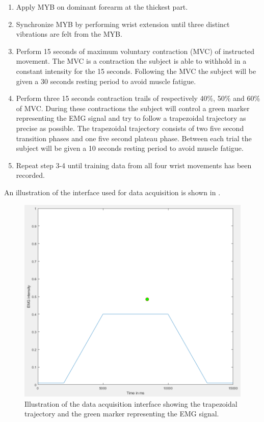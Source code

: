\begin{enumerate}
	\item Apply MYB on dominant forearm at the thickest part.
	\item Synchronize MYB by performing wrist extension until three distinct vibrations are felt from the MYB.
	\item Perform 15 seconds of maximum voluntary contraction (MVC) of instructed movement. The MVC is a contraction the subject is able to withhold in a constant intensity for the 15 seconds. Following the MVC the subject will be given a 30 seconds resting period to avoid muscle fatigue.
	\item Perform three 15 seconds contraction trails of respectively 40\%, 50\% and 60\% of MVC. During these contractions the subject will control a green marker representing the EMG signal and try to follow a trapezoidal trajectory as precise as possible. The trapezoidal trajectory consists of two five second transition phases and one five second plateau phase. Between each trial the subject will be given a 10 seconds resting period to avoid muscle fatigue.
	\item Repeat step 3-4 until training data from all four wrist movements has been recorded.
\end{enumerate}

An illustration of the interface used for data acquisition is shown in .

\begin{figure}[H]                 
	\includegraphics[width=.8\textwidth]{figures/xBackground/dataacqGUI2}  
	\caption{Illustration of the data acquisition interface showing the trapezoidal trajectory and the green marker representing the EMG signal.}
	\label{fig:dataacqGUI} 
\end{figure}

